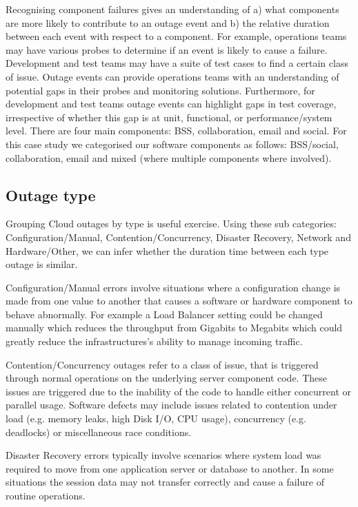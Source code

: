 Recognising component failures gives an understanding of a) what components are more likely to contribute to an outage event and b) the relative duration between each event with respect to a component. For example, operations teams may have various probes to determine if an event is likely to cause a failure. Development and test teams may have a suite of test cases to find a certain class of issue. Outage events can provide operations teams with an understanding of potential gaps in their probes and monitoring solutions. Furthermore, for development and test teams outage events can highlight gaps in test coverage, irrespective of whether this gap is at unit, functional, or performance/system level. There are four main components: BSS, collaboration, email and social. For this case study we categorised our software components as follows: BSS/social, collaboration, email and mixed (where multiple components where involved). \par

\subsection{Outage type}
Grouping Cloud outages by type is useful exercise. Using these sub categories: Configuration/Manual, Contention/Concurrency, Disaster Recovery, Network and Hardware/Other, we can infer whether the duration time between each type outage is similar.

Configuration/Manual errors involve situations where a configuration change is made from one value to another that causes a software or hardware component to behave abnormally. For example a Load Balancer setting could be changed manually which reduces the throughput from Gigabits to Megabits which could greatly reduce the infrastructures's ability to manage incoming traffic.\par

Contention/Concurrency outages refer to a class of issue, that is triggered through normal operations on the underlying server component code. These issues are triggered due to the inability of the code to handle either concurrent or parallel usage. Software defects may include issues related to contention under load (e.g. memory leaks, high Disk I/O, CPU usage), concurrency (e.g. deadlocks) or miscellaneous race conditions. \par

Disaster Recovery errors typically involve scenarios where system load was required to move from one application server or database to another. In some situations the session data may not transfer correctly and cause a failure of routine operations. \par

